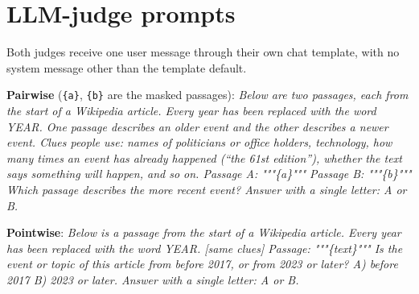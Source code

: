 \documentclass[11pt]{article}
\begin{document}
\section{LLM-judge prompts}
\label{app:prompts}

Both judges receive one user message through their own chat template, with no system message other than the template default.

\noindent\textbf{Pairwise} (\texttt{\{a\}}, \texttt{\{b\}} are the masked passages): \emph{Below are two passages, each from the start of a Wikipedia article. Every year has been replaced with the word YEAR. One passage describes an older event and the other describes a newer event. Clues people use: names of politicians or office holders, technology, how many times an event has already happened (``the 61st edition''), whether the text says something will happen, and so on. Passage A: """\{a\}""" Passage B: """\{b\}""" Which passage describes the more recent event? Answer with a single letter: A or B.}

\noindent\textbf{Pointwise}: \emph{Below is a passage from the start of a Wikipedia article. Every year has been replaced with the word YEAR. [same clues] Passage: """\{text\}""" Is the event or topic of this article from before 2017, or from 2023 or later? A) before 2017 B) 2023 or later. Answer with a single letter: A or B.}
\end{document}
